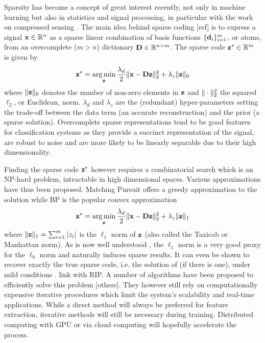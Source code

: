 Sparsity has become a concept of great interest recently, not only in
machine learning but also in statistics and signal processing, in particular with the work on compressed sensing \cite{candes2005CS, donoho2006CS}. The main idea behind sparse coding {\color{red} [ref]} is to express a signal $\mathbf{x} \in \mathbb{R}^n$ as a sparse linear combination of basis functions $\{\mathbf{d}_i\}_{i=1}^m$, or atoms, from an overcomplete ($m>n$) dictionary $\mathbf{D} \in \mathbb{R}^{n \times m}$. The sparse code $\mathbf{z}^* \in \mathbb{R}^m$ is given by
\begin{equation}\label{eqn:sparsecoding}
\mathbf{z}^* = \operatorname*{arg\,min}\limits_{\mathbf{z}} \frac{\lambda_d}{2} \| \mathbf{x} - \mathbf{D} \mathbf{z} \|_2^2 + \lambda_z \| \mathbf{z} \|_0
\end{equation}
where $\| \mathbf{z} \|_0$ denotes the number of non-zero elements in $\mathbf{z}$ and $\| \cdot \|_2^2$ the squared $\ell_2$, or Euclidean, norm. $\lambda_d$ and $\lambda_z$ are the (redundant) hyper-parameters setting the trade-off between the data term (an accurate reconstruction) and the prior (a sparse solution). Overcomplete sparse representations tend to be good features for classification systems as they provide a succinct representation of the signal, are robust to noise and are more likely to be linearly separable due to their high dimensionality.

Finding the sparse code $\mathbf{z}^*$ however requires a combinatorial search which is an NP-hard problem, intractable in high dimensional spaces. Various approximations have thus been proposed. Matching Pursuit \cite{mallat1993MatchingPursuit} offers a greedy approximation to the solution while \gls{BP} \cite{chen1998BasisPursuit} is the popular convex approximation
\begin{equation}\label{eqn:basispursuit}
\mathbf{z}^* = \operatorname*{arg\,min}\limits_{\mathbf{z}} \frac{\lambda_d}{2} \| \mathbf{x} - \mathbf{D} \mathbf{z} \|_2^2 + \lambda_z \| \mathbf{z} \|_1
\end{equation}
where $\| \mathbf{z} \|_1 = \sum_{i=1}^{m} |z_i|$ is the $\ell_1$ norm of $\mathbf{z}$ (also called the Taxicab or Manhattan norm). As is now well understood \cite{candes2005CS, donoho2006CS}, the $\ell_1$ norm is a very good proxy for the $\ell_0$ norm and naturally induces sparse results. It can even be shown to recover exactly the true sparse code, i.e. the solution of  (if there is one), under mild conditions \cite{donoho2003OptSparse}. {\color{red}link with \gls{RIP}}. A number of algorithms have been proposed to efficiently solve this problem \cite{chen1998BasisPursuit, beck2009FISTA, ng2006EfficientSparse, li2009Coordinate} {\color{red} [others]}. They however still rely on computationally expensive iterative procedures which limit the system's scalability and real-time applications. While a direct method will always be preferred for feature extraction, iterative methods will still be necessary during training. Distributed computing with \gls{GPU} or via cloud computing will hopefully accelerate the process.

